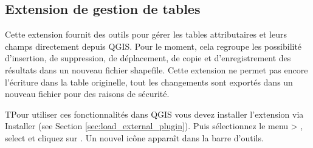 \subsection{Extension de gestion de tables}\label{sec:ftools}

Cette extension fournit des outils pour gérer les tables attributaires et leurs champs directement depuis QGIS. Pour le moment, cela regroupe les possibilité d'insertion, de suppression, de déplacement, de copie et d'enregistrement des résultats dans un nouveau fichier shapefile. Cette extension ne permet pas encore l'écriture dans la table originelle, tout les changements sont exportés dans un nouveau fichier pour des raisons de sécurité.


TPour utiliser ces fonctionnalités dans QGIS vous devez installer l'extension via  Installer (see Section 
\ref{sec:load_external_plugin}). Puis sélectionnez le menu  > , select  et cliquez sur . Un nouvel icône  apparaît dans la barre d'outils.





